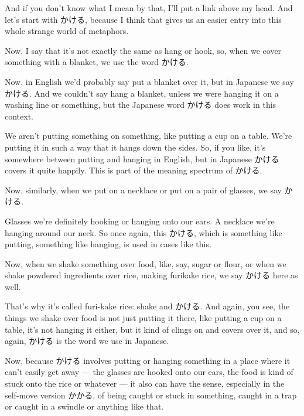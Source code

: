 {}

And if you don't know what I mean by that, I'll put a link above my head. And let's start with かける, because I think that gives us an easier entry into this whole strange world of metaphors.

\startsectionlevel[title={かける},reference={かける}]

Now, I say that it's not exactly the same as hang or hook, so, when we cover something with a blanket, we use the word かける.

{}

Now, in English we'd probably say put a blanket over it, but in Japanese we say かける. And we couldn't say hang a blanket, unless we were hanging it on a washing line or something, but the Japanese word かける does work in this context.

We aren't putting something on something, like putting a cup on a table. We're putting it in such a way that it hangs down the sides. So, if you like, it's somewhere between putting and hanging in English, but in Japanese かける covers it quite happily. This is part of the meaning spectrum of かける.

Now, similarly, when we put on a necklace or put on a pair of glasses, we say かける.

{}

Glasses we're definitely hooking or hanging onto our ears. A necklace we're hanging around our neck. So once again, this かける, which is something like putting, something like hanging, is used in cases like this.

Now, when we shake something over food, like, say, sugar or flour, or when we shake powdered ingredients over rice, making furikake rice, we say かける here as well.

{}

That's why it's called furi-kake rice: shake and かける. And again, you see, the things we shake over food is not just putting it there, like putting a cup on a table, it's not hanging it either, but it kind of clings on and covers over it, and so, again, かける is the word we use in Japanese.

Now, because かける involves putting or hanging something in a place where it can't easily get away --- the glasses are hooked onto our ears, the food is kind of stuck onto the rice or whatever --- it also can have the sense, especially in the self-move version かかる, of being caught or stuck in something, caught in a trap or caught in a swindle or anything like that.

